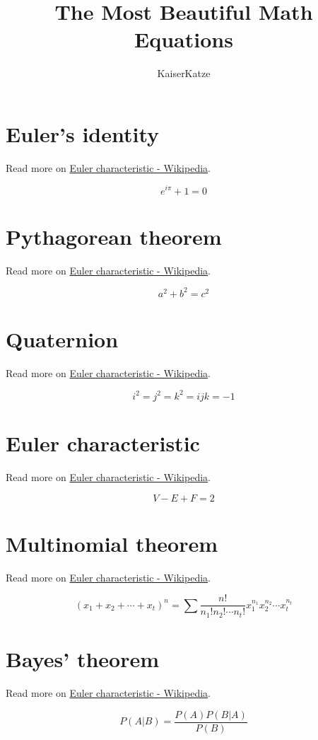 \documentclass[12pt]{article}
\title{The Most Beautiful Math Equations}
\author{KaiserKatze}
\begin{document}
\maketitle

\section{Euler's identity}
Read more on \href{https://en.wikipedia.org/wiki/Euler%27s_identity}{Euler characteristic - Wikipedia}.

$$ e^{i \pi} + 1 = 0 $$

\section{Pythagorean theorem}
Read more on \href{https://en.wikipedia.org/wiki/Pythagorean_theorem}{Euler characteristic - Wikipedia}.

$$ a^2 + b^2 = c^2 $$

\section{Quaternion}
Read more on \href{https://en.wikipedia.org/wiki/Quaternion}{Euler characteristic - Wikipedia}.

$$ i^2 = j^2 = k^2 = ijk = -1 $$

\section{Euler characteristic}
Read more on \href{https://en.wikipedia.org/wiki/Euler_characteristic}{Euler characteristic - Wikipedia}.

$$ V - E + F = 2 $$

\section{Multinomial theorem}
Read more on \href{https://en.wikipedia.org/wiki/Multinomial_theorem}{Euler characteristic - Wikipedia}.

$$ (x_1+x_2+\cdots+x_t)^n=\sum\frac{n!}{n_1!n_2!\cdots n_t!}x_1^{n_1}x_2^{n_2}\cdots x_t^{n_t} $$

\section{Bayes' theorem}
Read more on \href{https://en.wikipedia.org/wiki/Bayes%27_theorem}{Euler characteristic - Wikipedia}.

$$ P\left(A|B\right) = \frac{P\left(A\right)P\left(B|A\right)}{P\left(B\right)} $$
\end{document}
